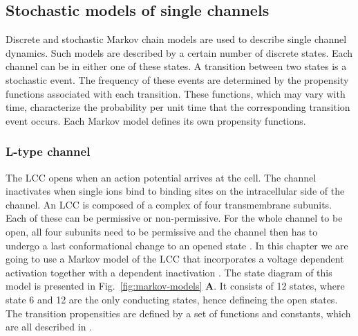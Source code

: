 \subsection*{Stochastic models of single channels}
\label{sec:stochastic-models}
Discrete and stochastic Markov chain models are used to describe single channel dynamics. Such models are described by a certain number of discrete states. Each channel can be in either one of these states. A transition between two states is a stochastic event. The frequency of these events are determined by the propensity functions associated with each transition. These functions, which may vary with time, characterize the probability per unit time that the corresponding transition event occurs. Each Markov model defines its own propensity functions. \par

\subsubsection*{L-type \Ca channel}
\label{sec:lcc}
The LCC opens when an action potential arrives at the cell. The channel inactivates when single \Ca ions bind to binding sites on the intracellular side of the channel. An LCC is composed of a complex of four transmembrane subunits. Each of these can be permissive or non-permissive. For the whole channel to be open, all four subunits need to be permissive and the channel then has to undergo a last conformational change to an opened state \cite{Hille2001}. In this chapter we are going to use a Markov model of the LCC that incorporates a voltage dependent activation together with a \Ca dependent inactivation \cite{JafriRiceEtAl1998,Gree_2002_2918}. The state diagram of this model is presented in Fig.~\ref{fig:markov-models} \textbf{A}. It consists of 12 states, where state 6 and 12 are the only conducting states, hence defineing the open states. The transition propensities are defined by a set of functions and constants, which are all described in \citet{GreensteinWinslow2002}.\par

